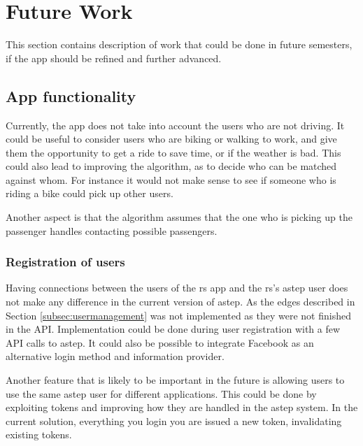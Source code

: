 \section{Future Work}\label{sec:future}
This section contains description of work that could be done in future semesters, if the app should be refined and further advanced.

\subsection{App functionality}
Currently, the app does not take into account the users who are not driving.
It could be useful to consider users who are biking or walking to work, and give them the opportunity to get a ride to save time, or if the weather is bad.
This could also lead to improving the algorithm, as to decide who can be matched against whom.
For instance it would not make sense to see if someone who is riding a bike could pick up other users.

Another aspect is that the algorithm assumes that the one who is picking up the passenger handles contacting possible passengers.

\subsubsection*{Registration of users}
Having connections between the users of the \gls{rs} app and the \gls{rs}'s \gls{astep} user does not make any difference in the current version of \gls{astep}.
As the edges described in Section \ref{subsec:usermanagement} was not implemented as they were not finished in the API.
Implementation could be done during user registration with a few API calls to \gls{astep}.
It could also be possible to integrate Facebook as an alternative login method and information provider.

Another feature that is likely to be important in the future is allowing users to use the same \gls{astep} user for different applications.
This could be done by exploiting tokens and improving how they are handled in the \gls{astep} system.
In the current solution, everything you login you are issued a new token, invalidating existing tokens.

